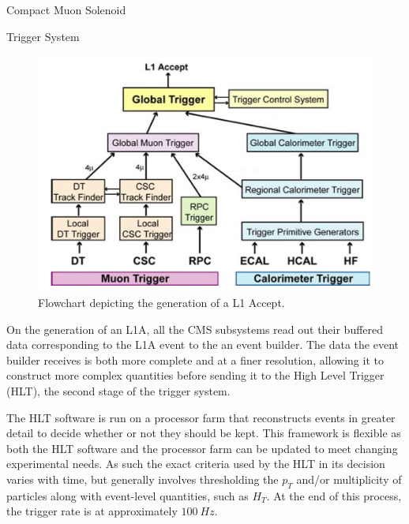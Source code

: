\begin{section}{Compact Muon Solenoid}
\begin{subsection}{Trigger System}
\begin{figure}[tbp!]
\begin{center}
\includegraphics[angle=0,width=0.80\columnwidth]{fig/cms_trigger.png}
\end{center}
\caption{Flowchart depicting the generation of a L1 Accept.}
\label{fig:cms_trigger}
\end{figure}

On the generation of an L1A, all the CMS subsystems read out their buffered data corresponding to the L1A event to the an event builder.
The data the event builder receives is both more complete and at a finer resolution, allowing it to construct more complex quantities before sending it to the High Level Trigger (HLT), the second stage of the trigger system.

The HLT software is run on a processor farm that reconstructs events in greater detail to decide whether or not they should be kept.
This framework is flexible as both the HLT software and the processor farm can be updated to meet changing experimental needs.
As such the exact criteria used by the HLT in its decision varies with time, but generally involves thresholding the $p_{T}$ and/or multiplicity of particles along with event-level quantities, such as $H_{T}$.
At the end of this process, the trigger rate is at approximately $100~Hz$.

\end{subsection}

\end{section}




